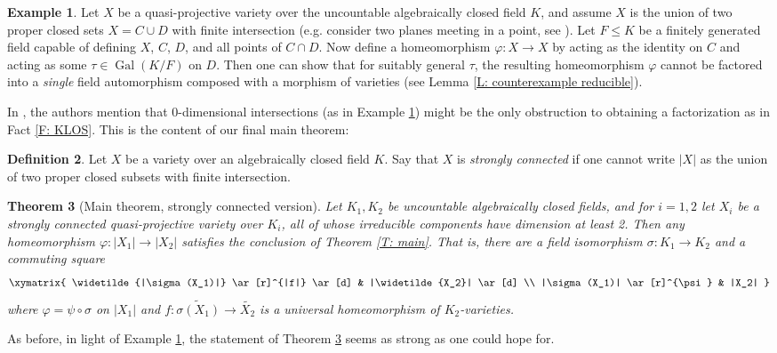 \documentclass{amsart}
\newtheorem{theorem}{Theorem}[section]
\theoremstyle{definition}
\newtheorem{definition}[theorem]{Definition}
\newtheorem{example}[theorem]{Example}
\begin{document}
\begin{example}\label{E: planes meeting at a point}
   Let $X$ be a quasi-projective variety over the uncountable algebraically closed field $K$, and assume $X$ is the union of two proper closed sets $X=C\cup D$ with finite intersection (e.g. consider two planes meeting in a point, see \cite[Remark 2.2.11]{KLOS}). Let $F\leq K$ be a finitely generated field capable of defining $X$, $C$, $D$, and all points of $C\cap D$. Now define a homeomorphism $\varphi:X\rightarrow X$ by acting as the identity on $C$ and acting as some $\tau\in\operatorname{Gal}(K/F)$ on $D$. Then one can show that for suitably general $\tau$, the resulting homeomorphism $\varphi$ cannot be factored into a \textit{single} field automorphism composed with a morphism of varieties (see Lemma \ref{L: counterexample reducible}).
\end{example}

In \cite[Remark 2.2.11]{KLOS}, the authors mention that 0-dimensional intersections (as in Example \ref{E: planes meeting at a point}) might be the only obstruction to obtaining a factorization as in Fact \ref{F: KLOS}. This is the content of our final main theorem:

\begin{definition}\label{D: str con}
    Let $X$ be a variety over an algebraically closed field $K$. Say that $X$ is \textit{strongly connected} if one cannot write $|X|$ as the union of two proper closed subsets with finite intersection.
\end{definition}


\begin{theorem}[Main theorem, strongly connected version]\label{T: main reducible}
    Let $K_1,K_2$ be uncountable algebraically closed fields, and for $i = 1,2$ let $X_i$ be a strongly connected quasi-projective variety over $K_i$, all of whose irreducible components have dimension at least 2. Then any homeomorphism $\varphi:|X_1|\rightarrow |X_2|$ satisfies the conclusion of Theorem \ref{T: main}. That is, there are a field isomorphism $\sigma : K_1 \to K_2$ and a commuting square
\[
\xymatrix{
\widetilde{|\sigma(X_1)|} \ar[r]^{|f|} \ar[d] & |\widetilde{X_2}| \ar[d] \\
|\sigma(X_1)| \ar[r]^{\psi} & |X_2|
}
\]
where $\varphi=\psi\circ\sigma$ on $|X_1|$ and $f:\widetilde{\sigma(X_1)}\rightarrow\widetilde{X_2}$ is a universal homeomorphism of $K_2$-varieties.
\end{theorem}

As before, in light of Example \ref{E: planes meeting at a point}, the statement of Theorem \ref{T: main reducible} seems as strong as one could hope for.
\end{document}
